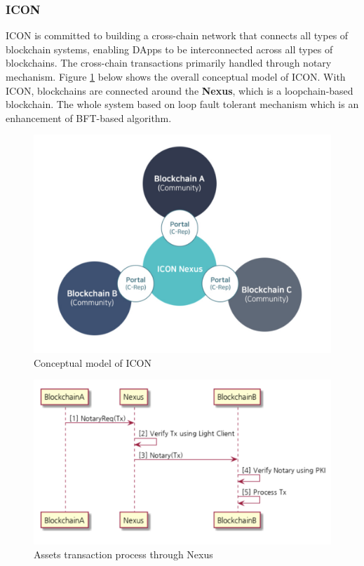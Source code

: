 \subsubsection{ICON}
\noindent ICON\cite{icon} is committed to building a cross-chain network that connects all types of blockchain systems, enabling DApps to be interconnected across all types of blockchains. The cross-chain transactions primarily handled through notary mechanism. Figure \ref{fig:concept} below shows the overall conceptual model of ICON. With ICON, blockchains are connected around the \textbf{Nexus}, which is a loopchain-based blockchain. The whole system based on loop fault tolerant mechanism which is an enhancement of BFT-based algorithm.  \\


 \begin{figure}[H]
        \includegraphics[width=1\textwidth]{./figures/iconconcept.png}
        \centering
        \caption{{Conceptual model of ICON}\protect\footnotemark}
        \centering
        \label{fig:concept}
        
        \end{figure}
        \begin{figure}[H]
        \includegraphics[width=1\textwidth]{./figures/icontrans.png}
        \centering
        \caption{{Assets transaction process through Nexus}\protect\footnotemark}
        \centering
        \label{fig:icon}
        
        \end{figure}
